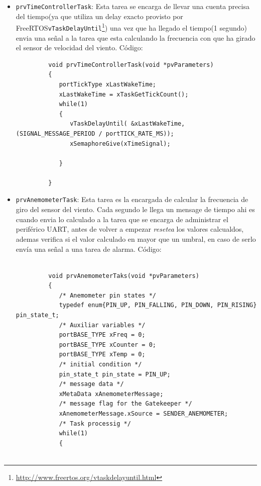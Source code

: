 \documentclass[10pt]{article}
\begin{document}
\begin{itemize}
   \item \verb|prvTimeControllerTask|: Esta tarea se encarga de llevar una cuenta precisa del tiempo(ya que utiliza un delay exacto provisto por FreeRTOS\texttrademark \verb|vTaskDelayUntil|\footnote{\url{http://www.freertos.org/vtaskdelayuntil.html}}) una vez que ha llegado el tiempo(1 segundo) envia una
      señal a la tarea que esta calculando la frecuencia con que ha girado el sensor de velocidad del viento. Código:
      \begin{verbatim}
         void prvTimeControllerTask(void *pvParameters)
         {
            portTickType xLastWakeTime;
            xLastWakeTime = xTaskGetTickCount();
            while(1)
            {
               vTaskDelayUntil( &xLastWakeTime, (SIGNAL_MESSAGE_PERIOD / portTICK_RATE_MS));
               xSemaphoreGive(xTimeSignal);

            }

         }
      \end{verbatim}
   \item\verb|prvAnemometerTask|: Esta tarea es la encargada de calcular la frecuencia de giro del sensor del viento. Cada segundo le llega un mensage de tiempo ahi es cuando envia lo calculado a la tarea que se encarga de administrar el periférico UART, antes de volver a empezar \textit{resetea} los valores calcualdos, ademas verifica si el valor calculado en mayor que un umbral, en caso de serlo envía una señal a una tarea de alarma. Código:
      \begin{verbatim}
         
         void prvAnemometerTaks(void *pvParameters)
         {
            /* Anemometer pin states */
            typedef enum{PIN_UP, PIN_FALLING, PIN_DOWN, PIN_RISING} pin_state_t;
            /* Auxiliar variables */
            portBASE_TYPE xFreq = 0;
            portBASE_TYPE xCounter = 0;
            portBASE_TYPE xTemp = 0;
            /* initial condition */
            pin_state_t pin_state = PIN_UP;
            /* message data */
            xMetaData xAnemometerMessage;
            /* message flag for the Gatekeeper */
            xAnemometerMessage.xSource = SENDER_ANEMOMETER;
            /* Task processig */
            while(1)
            {


\end{verbatim}
\end{itemize}
\end{document}
